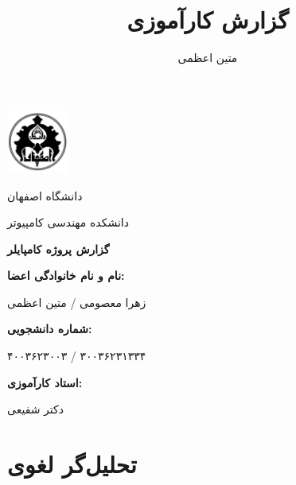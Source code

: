 \documentclass[12pt, a4paper]{report}
\title{گزارش کارآموزی}
\author{متین اعظمی}
\begin{document}
\begin{titlepage}
	\centering
	\includegraphics[width=0.15\textwidth]{images/logo.png}
	
	{\Large دانشگاه اصفهان}\par
	{\Large دانشکده مهندسی کامپیوتر}\par\vspace{2cm}
	
	\textbf
	{\Huge گزارش پروژه کامپایلر}\par\vspace{1.5cm}
	
	\large
	\textbf{نام و نام خانوادگی اعضا:}\par{زهرا معصومی / متین اعظمی}\par\vspace{0.5cm}  
	\textbf{شماره دانشجویی:}\par{۴۰۰۳۶۲۳۰۰۳ / ۳۰۰۳۶۲۳۱۳۳۴}\par\vspace{0.5cm}
	\textbf{استاد کارآموزی:}\par{دکتر شفیعی}\par\vspace{0.5cm}
		
	\par\vspace{2cm}
	
	
\end{titlepage}

\tableofcontents

\listoftables

\listoffigures


\chapter{تحلیل‌گر لغوی}

\section{}
\end{document}
